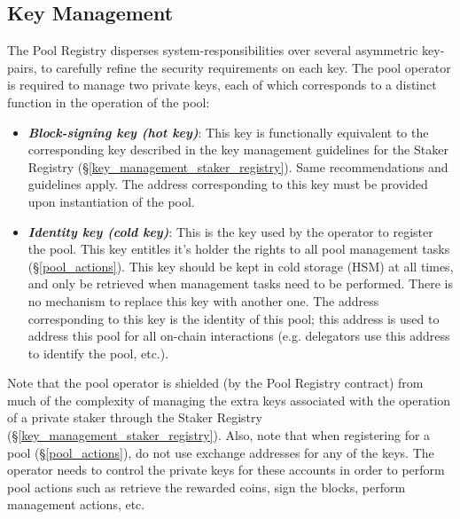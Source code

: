 \subsection{Key Management} \label{key_management_pool_registry}
The Pool Registry disperses system-responsibilities over several asymmetric key-pairs, to carefully refine the security requirements on each key. The pool operator is required to manage two private keys, each of which corresponds to a distinct function in the operation of the pool: 
\begin{itemize}
    \item \textbf{\textit{Block-signing key (hot key)}}: This key is functionally equivalent to the corresponding key described in the key management guidelines for the Staker Registry (\S\ref{key_management_staker_registry}). Same recommendations and guidelines apply. The address corresponding to this key must be provided upon instantiation of the pool. 
    \item \textbf{\textit{Identity key (cold key)}}: This is the key used by the operator to register the pool. This key entitles it's holder the rights to all pool management tasks (\S\ref{pool_actions}). This key should be kept in cold storage (HSM) at all times, and only be retrieved when management tasks need to be performed. There is no mechanism to replace this key with another one. The address corresponding to this key is the identity of this pool; this address is used to address this pool for all on-chain interactions (e.g. delegators use this address to identify the pool, etc.). 
\end{itemize}
Note that the pool operator is shielded (by the Pool Registry contract) from much of the complexity of managing the extra keys associated with the operation of a private staker through the Staker Registry (\S\ref{key_management_staker_registry}). Also, note that when registering for a pool (\S\ref{pool_actions}), do not use exchange addresses for any of the keys. The operator needs to control the private keys for these accounts in order to perform pool actions such as retrieve the rewarded coins, sign the blocks, perform management actions, etc. 


